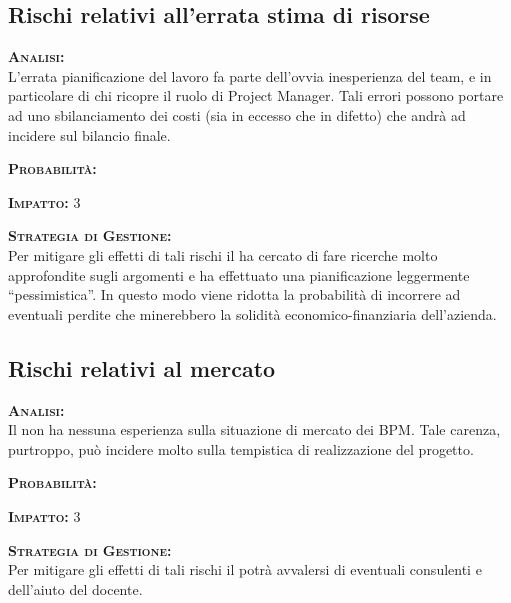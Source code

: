 \subsection{Rischi relativi all'errata stima di risorse}
\begin{description}
	\item{\scshape\bfseries Analisi:}\\
	L'errata pianificazione del lavoro fa parte dell'ovvia inesperienza del team, e in particolare di chi ricopre il ruolo di Project Manager. Tali errori possono portare ad uno sbilanciamento dei costi (sia in eccesso che in difetto) che andrà ad incidere sul bilancio finale.
	\item{\scshape\bfseries Probabilità:} \med
	\item{\scshape\bfseries Impatto:} 3 
	\item{\scshape\bfseries Strategia di Gestione:}\\
	Per mitigare gli effetti di tali rischi il  ha cercato di fare ricerche molto approfondite sugli argomenti e ha effettuato una pianificazione leggermente ``pessimistica''. In questo modo viene ridotta la probabilità di incorrere ad eventuali perdite che minerebbero la solidità economico-finanziaria dell'azienda.
\end{description}

\subsection{Rischi relativi al mercato}
\begin{description}
	\item{\scshape\bfseries Analisi:}\\
	Il  non ha nessuna esperienza sulla situazione di mercato dei  BPM\@. Tale carenza, purtroppo, può incidere molto sulla tempistica di realizzazione del progetto.
	\item{\scshape\bfseries Probabilità:} \hi
	\item{\scshape\bfseries Impatto:} 3 
	\item{\scshape\bfseries Strategia di Gestione:}\\
	Per mitigare gli effetti di tali rischi il  potrà avvalersi di eventuali consulenti e dell'aiuto del docente.
\end{description}	


